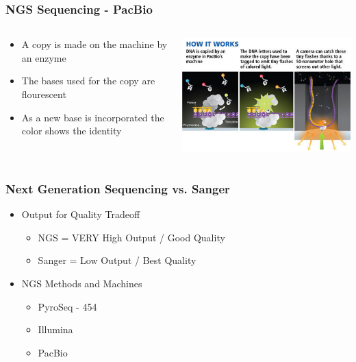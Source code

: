 \documentclass[14pt]{beamer}
\begin{document}
\begin{frame}
\frametitle{NGS Sequencing - PacBio}
\begin{columns}
	\begin{column}{0.5\textwidth}
		\begin{itemize}
			\item A copy is made on the machine by an enzyme
			\item The bases used for the copy are flourescent
			\item As a new base is incorporated the color shows the identity
		\end{itemize}
	\end{column}
	\begin{column}{0.5\textwidth}
    	\begin{center}
     		\includegraphics[width=1\textwidth]{images_20170905_pacbio.jpg}
     	\end{center}
		\end{column}
	\end{columns}
\end{frame}

\begin{frame}
\frametitle{Next Generation Sequencing vs. Sanger}
\begin{itemize}
	\item<1-> Output for Quality Tradeoff
	\begin{itemize}
		\item NGS = VERY High Output / Good Quality
		\item Sanger = Low Output / Best Quality
	\end{itemize}
	\item<2-> NGS Methods and Machines
	\begin{itemize}
		\item<3-> PyroSeq - 454
		\item<4-> Illumina
		\item<5-> PacBio
	\end{itemize}
\end{itemize}
\end{frame}
\end{document}
